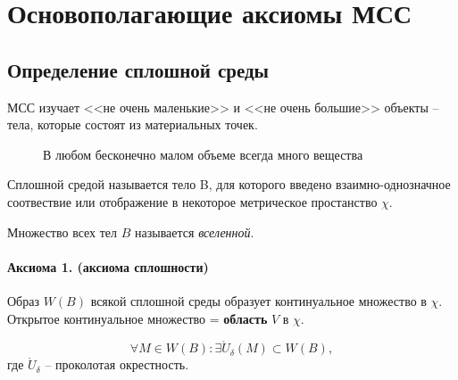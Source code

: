 \section{Основополагающие аксиомы МСС}

\subsection{Определение сплошной среды}

\begin{figure}[H]
	\centering
	
\end{figure}

МСС изучает <<не очень маленькие>> и <<не очень большие>> объекты -- тела, которые состоят
из материальных точек.

\begin{figure}[h!]
  \centering
  
  \caption{В любом бесконечно малом объеме всегда много вещества}
\end{figure}

\begin{definition}
  Сплошной средой называется тело B, для которого введено взаимно-однозначное соотвествие
  или отображение в некоторое метрическое простанство $\chi$.
\end{definition}

\begin{figure}[H]
	\centering
	
\end{figure}

\begin{definition}
  Множество всех тел $B$ называется \emph{вселенной}.
\end{definition}

\paragraph{Аксиома 1. (аксиома сплошности)} Образ $W(B)$ всякой сплошной среды образует континуальное
множество в $\chi$. Открытое континуальное множество = \textbf{область} $V$ в $\chi$.

\begin{figure}[H]
	\centering
	
\end{figure}

\[
  \forall M \in W(B) : \exists \mathring{U}_\delta (M) \subset W(B),
\]
где $\mathring{U}_\delta$ -- проколотая окрестность.

